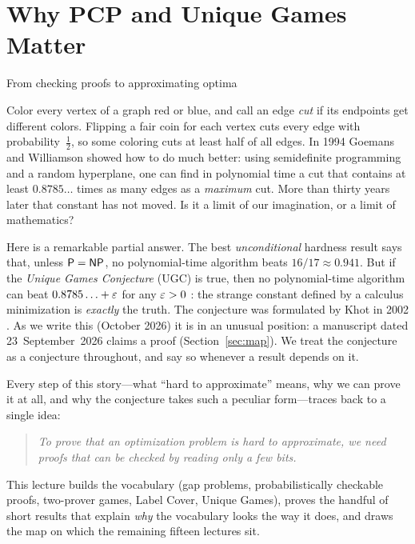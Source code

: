 \chapter{Why PCP and Unique Games Matter}
\label{lec:why}

{\sffamily\large\color{softgray}From checking proofs to approximating optima\par}
\vspace{0.5em}

\noindent
Color every vertex of a graph red or blue, and call an edge \emph{cut} if its endpoints
get different colors.  Flipping a fair coin for each vertex cuts every edge with
probability~$\tfrac12$, so some coloring cuts at least half of all edges.  In 1994
Goemans and Williamson \citep{GW95} showed how to do much better: using semidefinite
programming and a random hyperplane, one can find in polynomial time a cut that contains
at least $0.8785\ldots$ times as many edges as a \emph{maximum} cut.  More than thirty
years later that constant has not moved.  Is it a limit of our imagination, or a limit of
mathematics?

Here is a remarkable partial answer.  The best \emph{unconditional} hardness result says
that, unless $\mathsf{P}=\mathsf{NP}$, no polynomial-time algorithm beats $16/17\approx 0.941$.  But
if the \emph{Unique Games Conjecture} (UGC) is true, then no polynomial-time algorithm can
beat $0.8785\ldots+\varepsilon$ for any $\varepsilon>0$ \citep{KKMO07,MOO10}: the strange constant defined
by a calculus minimization is \emph{exactly} the truth.  The conjecture was formulated by
Khot in 2002 \citep{Khot02}.  As we write this (October 2026) it is in an unusual
position: a manuscript dated 23~September~2026 claims a proof (Section~\ref{sec:map}).  We
treat the conjecture as a conjecture throughout, and say so whenever a result depends on it.

Every step of this story---what ``hard to approximate'' means, why we can prove it at all,
and why the conjecture takes such a peculiar form---traces back to a single idea:

\begin{quote}\itshape
To prove that an optimization problem is hard to approximate, we need proofs that can be
checked by reading only a few bits.
\end{quote}

\noindent
This lecture builds the vocabulary (gap problems, probabilistically checkable proofs,
two-prover games, Label Cover, Unique Games), proves the handful of short results that
explain \emph{why} the vocabulary looks the way it does, and draws the map on which the
remaining fifteen lectures sit.


